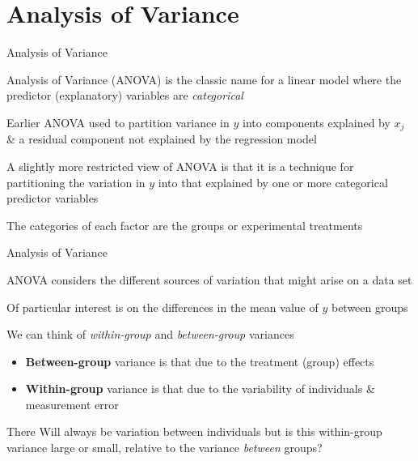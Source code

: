 \documentclass[10pt,ignorenonframetext,compress, aspectratio=169]{beamer}
\providecommand{\tightlist}{%
  \setlength{\itemsep}{0pt}\setlength{\parskip}{0pt}}
\begin{document}
\section{Analysis of Variance}\label{analysis-of-variance}

\begin{frame}{Analysis of Variance}

\alert{Analysis of Variance} (ANOVA) is the classic name for a linear
model where the predictor (explanatory) variables are \emph{categorical}

Earlier ANOVA used to partition variance in \(y\) into components
explained by \(x_j\) \& a residual component not explained by the
regression model

A slightly more restricted view of ANOVA is that it is a technique for
partitioning the variation in \(y\) into that explained by one or more
categorical predictor variables

The categories of each factor are the groups or experimental treatments

\end{frame}

\begin{frame}{Analysis of Variance}

ANOVA considers the different sources of variation that might arise on a
data set

Of particular interest is on the differences in the mean value of \(y\)
between groups

We can think of \emph{within-group} and \emph{between-group} variances

\begin{itemize}
\tightlist
\item
  \textbf{Between-group} variance is that due to the treatment (group)
  effects
\item
  \textbf{Within-group} variance is that due to the variability of
  individuals \& measurement error
\end{itemize}

There Will always be variation between individuals but is this
within-group variance large or small, relative to the variance
\emph{between} groups?

\end{frame}
\end{document}
